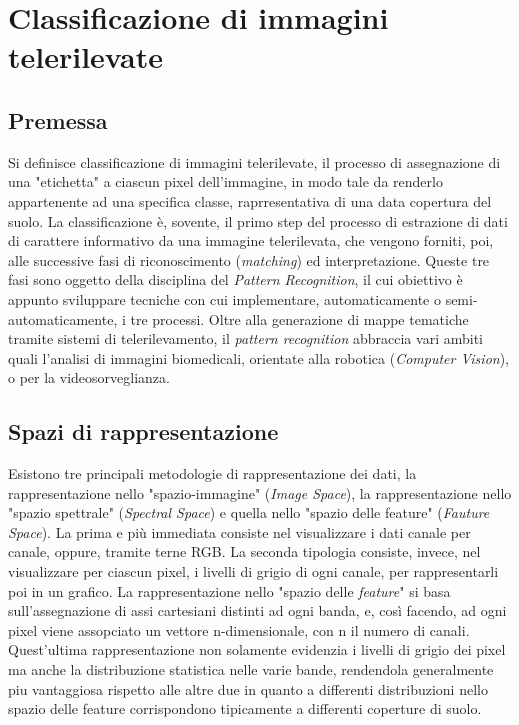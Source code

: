 \section{Classificazione di immagini telerilevate}

\subsection{Premessa}

Si definisce classificazione di immagini telerilevate, il processo di assegnazione di una "etichetta" a ciascun pixel dell'immagine, in modo tale da renderlo appartenente ad una specifica classe, raprresentativa di una data copertura del suolo.
La classificazione è, sovente, il primo step del processo di estrazione di dati di carattere informativo da una immagine telerilevata, che vengono forniti, poi, alle successive fasi di riconoscimento (\emph{matching}) ed interpretazione. 
Queste tre fasi sono oggetto della disciplina del \emph{Pattern Recognition}, il cui obiettivo è appunto sviluppare tecniche con cui implementare, automaticamente o semi-automaticamente, i tre processi.
Oltre alla generazione di mappe tematiche tramite sistemi di telerilevamento, il \emph{pattern recognition} abbraccia vari ambiti quali l'analisi di immagini biomedicali, orientate alla robotica (\emph{Computer Vision}), o per la videosorveglianza.   


\subsection{Spazi di rappresentazione}

Esistono tre principali metodologie di rappresentazione dei dati, la rappresentazione nello "spazio-immagine" (\emph{Image Space}), la rappresentazione nello "spazio spettrale" (\emph{Spectral Space}) e quella nello "spazio delle feature" (\emph{Fauture Space}). La prima e più immediata consiste nel visualizzare i dati canale per canale, oppure, tramite terne RGB. La seconda tipologia consiste, invece, nel visualizzare per ciascun pixel, i livelli di grigio di ogni canale, per rappresentarli poi in un grafico. La rappresentazione nello "spazio delle \emph{feature}" si basa sull'assegnazione di assi cartesiani distinti ad ogni banda, e, così facendo, ad ogni pixel viene assopciato un vettore n-dimensionale, con n il numero di canali. Quest'ultima rappresentazione non solamente evidenzia i livelli di grigio dei pixel ma anche la distribuzione statistica nelle varie bande, rendendola generalmente piu vantaggiosa rispetto alle altre due in quanto a differenti distribuzioni nello spazio delle feature corrispondono tipicamente a differenti coperture di suolo.  

